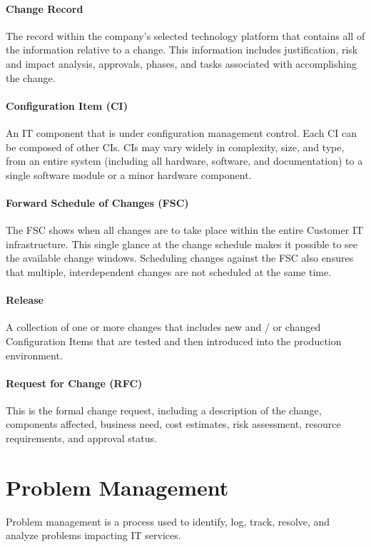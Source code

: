 \documentclass[8pt]{extarticle}
\begin{document}
\begin{multicols}{3}
    \paragraph{Change Record} The record within the company’s selected technology platform that contains all of the
    information relative to a change. This information includes justification, risk and impact analysis,
    approvals, phases, and tasks associated with accomplishing the change.
    \paragraph{Configuration Item (CI)} An IT component that is under configuration management control. Each CI can
    be composed of other CIs. CIs may vary widely in complexity, size, and type, from an entire system
    (including all hardware, software, and documentation) to a single software module or a minor hardware
    component.
    \paragraph{Forward Schedule of Changes (FSC)} The FSC shows when all changes are to take place within the
    entire Customer IT infrastructure. This single glance at the change schedule makes it possible to see the
    available change windows. Scheduling changes against the FSC also ensures that multiple,
    interdependent changes are not scheduled at the same time.
    \paragraph{Release} A collection of one or more changes that includes new and / or changed Configuration Items
    that are tested and then introduced into the production environment.
    \paragraph{Request for Change (RFC)} This is the formal change request, including a description of the change,
    components affected, business need, cost estimates, risk assessment, resource requirements, and
    approval status.


\section{Problem Management}
Problem management is a process used to identify, log, track, resolve, and analyze problems impacting IT services.


\end{multicols}
\end{document}
